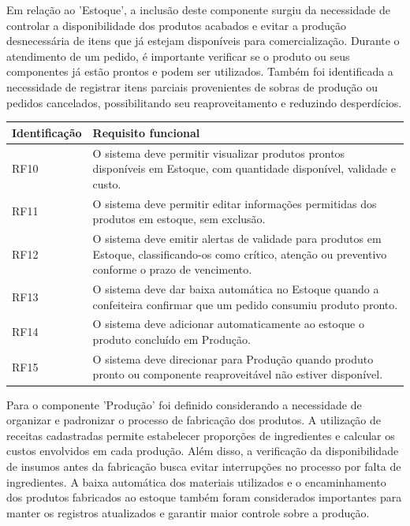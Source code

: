Em relação ao 'Estoque', a inclusão deste componente surgiu da necessidade de controlar a disponibilidade dos produtos acabados e evitar a produção desnecessária de itens que já estejam disponíveis para comercialização. Durante o atendimento de um pedido, é importante verificar se o produto ou seus componentes já estão prontos e podem ser utilizados. Também foi identificada a necessidade de registrar itens parciais provenientes de sobras de produção ou pedidos cancelados, possibilitando seu reaproveitamento e reduzindo desperdícios.

\begin{quadro}
    \centering
    \label{quadro:rf_estoque}

    \begin{tabular}{|p{3cm}|p{11cm}|}
        \hline
        \textbf{Identificação} & \textbf{Requisito funcional} \\ \hline

        RF10 & O sistema deve permitir visualizar produtos prontos disponíveis em Estoque, com quantidade disponível, validade e custo. \\ \hline

        RF11 & O sistema deve permitir editar informações permitidas dos produtos em estoque, sem exclusão. \\ \hline

        RF12 & O sistema deve emitir alertas de validade para produtos em Estoque, classificando-os como crítico, atenção ou preventivo conforme o prazo de vencimento. \\ \hline

        RF13 & O sistema deve dar baixa automática no Estoque quando a confeiteira confirmar que um pedido consumiu produto pronto. \\ \hline

        RF14 & O sistema deve adicionar automaticamente ao estoque o produto concluído em Produção. \\ \hline

        RF15 & O sistema deve direcionar para Produção quando produto pronto ou componente reaproveitável não estiver disponível. \\ \hline
    \end{tabular}

    \vspace{0.2cm}
\end{quadro}

Para o componente 'Produção' foi definido considerando a necessidade de organizar e padronizar o processo de fabricação dos produtos. A utilização de receitas cadastradas permite estabelecer proporções de ingredientes e calcular os custos envolvidos em cada produção. Além disso, a verificação da disponibilidade de insumos antes da fabricação busca evitar interrupções no processo por falta de ingredientes. A baixa automática dos materiais utilizados e o encaminhamento dos produtos fabricados ao estoque também foram considerados importantes para manter os registros atualizados e garantir maior controle sobre a produção.


